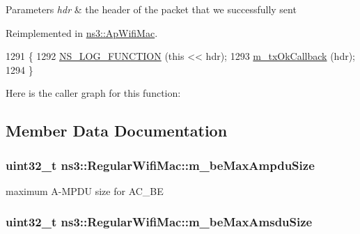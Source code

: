 \begin{DoxyParams}{Parameters}
{\em hdr} & the header of the packet that we successfully sent \\
\hline
\end{DoxyParams}


Reimplemented in \hyperlink{classns3_1_1ApWifiMac_a42c321554bcf340cf7d3da46ad95b836}{ns3\+::\+Ap\+Wifi\+Mac}.


\begin{DoxyCode}
1291 \{
1292   \hyperlink{log-macros-disabled_8h_a90b90d5bad1f39cb1b64923ea94c0761}{NS\_LOG\_FUNCTION} (\textcolor{keyword}{this} << hdr);
1293   \hyperlink{classns3_1_1RegularWifiMac_aa6135b5824d4ee16632c1f4783d49c28}{m\_txOkCallback} (hdr);
1294 \}
\end{DoxyCode}


Here is the caller graph for this function\+:




\subsection{Member Data Documentation}
\subsubsection[{\texorpdfstring{m\+\_\+be\+Max\+Ampdu\+Size}{m_beMaxAmpduSize}}]{\setlength{\rightskip}{0pt plus 5cm}uint32\+\_\+t ns3\+::\+Regular\+Wifi\+Mac\+::m\+\_\+be\+Max\+Ampdu\+Size\hspace{0.3cm}{\ttfamily [private]}}\hypertarget{classns3_1_1RegularWifiMac_a139ebfbbc6ace4132a56b3b437626720}{}\label{classns3_1_1RegularWifiMac_a139ebfbbc6ace4132a56b3b437626720}


maximum A-\/\+M\+P\+DU size for A\+C\+\_\+\+BE 

\subsubsection[{\texorpdfstring{m\+\_\+be\+Max\+Amsdu\+Size}{m_beMaxAmsduSize}}]{\setlength{\rightskip}{0pt plus 5cm}uint32\+\_\+t ns3\+::\+Regular\+Wifi\+Mac\+::m\+\_\+be\+Max\+Amsdu\+Size\hspace{0.3cm}{\ttfamily [private]}}\hypertarget{classns3_1_1RegularWifiMac_ab72ab6c9fc9eaf3ba8e67bc3fcf7937b}{}\label{classns3_1_1RegularWifiMac_ab72ab6c9fc9eaf3ba8e67bc3fcf7937b}


